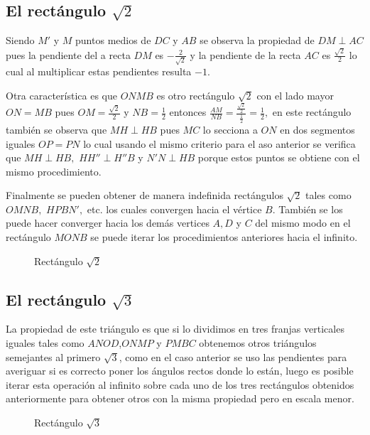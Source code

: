 \subsection{El rectángulo $\sqrt{2}$}

Siendo $M'$ y $M$ puntos medios de $DC$ y $AB$ se observa la propiedad de $DM\perp AC$  pues la pendiente del a recta $DM$ es $-\frac{2}{\sqrt{2}}$ y la pendiente de la recta $AC$ es $\frac{\sqrt{2}}{2}$ lo cual al multiplicar estas pendientes resulta $-1.$

Otra característica es que $ONMB$  es otro rectángulo $\sqrt{2}$ con el lado mayor $ON=MB$ pues $OM=\frac{\sqrt{2}}{2}$ y $NB=\frac{1}{2}$ entonces $\frac{AM}{NB}=\frac{\frac{\sqrt{2}}{2}}{\frac{1}{2}}=\frac{1}{2},$ en este rectángulo también se observa que $MH\perp HB$ pues $MC$ lo secciona a $ON$ en dos segmentos iguales $OP=PN$ lo cual usando el mismo criterio para el aso anterior  se verifica que $MH\perp HB,$ $HH''\perp H''B$ y $N'N\perp HB$ porque estos puntos se obtiene con el mismo procedimiento.

Finalmente se pueden obtener de manera indefinida rectángulos $\sqrt{2}$ tales como $OMNB,$ $HPBN',$ etc. los cuales convergen hacia el vértice $B.$ También se los puede hacer converger hacia los demás vertices $A, D$ y $C$ del mismo modo en el rectángulo $MONB$ se puede iterar los procedimientos anteriores hacia el infinito.

\begin{figure}[!ht]
	\begin{center}

	\end{center}
	\caption{Rectángulo $\sqrt{2}$}\label{de}
\end{figure}

\subsection{El rectángulo $\sqrt{3}$}


La propiedad de este triángulo es que si lo dividimos en tres franjas verticales iguales tales como $ANOD$,$ONMP$ y $PMBC$ obtenemos otros triángulos semejantes al primero $\sqrt{3}$, como en el caso anterior se uso las pendientes para averiguar si es correcto poner los ángulos rectos donde lo están, luego es posible iterar esta operación al infinito sobre cada uno de los tres rectángulos  obtenidos anteriormente para obtener otros con la misma propiedad pero en escala menor.


\begin{figure}[!ht]
	\begin{center}

	\end{center}
	\caption{Rectángulo $\sqrt{3}$}\label{3}
\end{figure}

